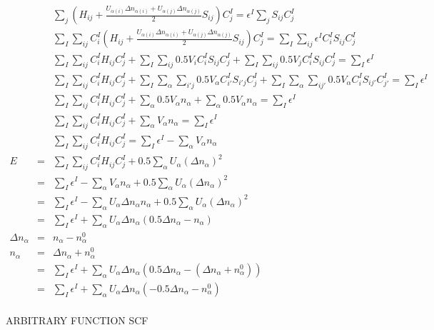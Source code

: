 \documentclass{article}
\begin{document}
\begin{eqnarray*}
 & & \sum_j \left(H_{ij} + \frac{U_{\alpha(i)} \Delta n_{\alpha(i)}  + U_{\alpha(j)} \Delta n_{\alpha(j)} }{2} S_{ij} \right) C^I_j = \epsilon^I \sum_j S_{ij} C^I_j \\
& & \sum_I \sum_{ij} C^I_i \left(H_{ij} + \frac{U_{\alpha(i)} \Delta n_{\alpha(i)}  + 
  U_{\alpha(j)} \Delta n_{\alpha(j)} }{2} S_{ij} \right) C^I_j 
  = \sum_I \sum_{ij} \epsilon^I C^I_i S_{ij} C^I_j \\
 & & \sum_I \sum_{ij} C^I_i H_{ij} C^I_j +
 \sum_I \sum_{ij} 0.5 V_i C^I_i S_{ij} C^I_j + \sum_I \sum_{ij} 0.5 V_j C^I_i S_{ij} C^I_j = \sum_I \epsilon^I \\
 & & \sum_I \sum_{ij} C^I_i H_{ij} C^I_j +
 \sum_I \sum_\alpha \sum_{i'j} 0.5 V_\alpha C^I_{i'} S_{i'j} C^I_j + 
 \sum_I \sum_\alpha \sum_{ij'} 0.5 V_\alpha C^I_i S_{ij'} C^I_{j'} = \sum_I \epsilon^I \\
 & & \sum_I \sum_{ij} C^I_i H_{ij} C^I_j +
 \sum_\alpha 0.5 V_\alpha n_\alpha +
 \sum_\alpha 0.5 V_\alpha n_\alpha =  \sum_I \epsilon^I \\
 & & \sum_I \sum_{ij} C^I_i H_{ij} C^I_j + \sum_\alpha  V_\alpha n_\alpha =  \sum_I \epsilon^I \\
 & & \sum_I \sum_{ij} C^I_i H_{ij} C^I_j = \sum_I \epsilon^I  - \sum_\alpha  V_\alpha n_\alpha  \\
E & = & \sum_I \sum_{ij} C^I_i H_{ij} C^I_j + 0.5 \sum_\alpha U_\alpha (\Delta n_\alpha)^2 \\
  & = & \sum_I \epsilon^I  - \sum_\alpha V_\alpha n_\alpha  + 0.5 \sum_\alpha U_\alpha (\Delta n_\alpha)^2 \\
  & = & \sum_I \epsilon^I  - \sum_\alpha U_\alpha \Delta n_\alpha n_\alpha  + 0.5 \sum_\alpha U_\alpha (\Delta n_\alpha)^2 \\
  & = & \sum_I \epsilon^I  + \sum_\alpha U_\alpha \Delta n_\alpha (0.5 \Delta n_\alpha - n_\alpha ) \\
\Delta n_\alpha & = & n_\alpha - n_\alpha^0 \\
n_\alpha & = & \Delta n_\alpha + n_\alpha^0 \\
  & = & \sum_I \epsilon^I  + \sum_\alpha U_\alpha \Delta n_\alpha (0.5 \Delta n_\alpha - (\Delta n_\alpha + n_\alpha^0)) \\
  & = & \sum_I \epsilon^I  + \sum_\alpha U_\alpha \Delta n_\alpha (-0.5 \Delta n_\alpha - n_\alpha^0) \\
\end{eqnarray*}

ARBITRARY FUNCTION SCF
\end{document}
